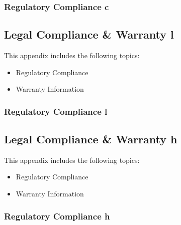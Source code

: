 \documentclass[letterpaper,10pt,openany,oneside,english]{sphinxmanual}
\begin{document}
\subsubsection{Regulatory Compliance c}
\label{\detokenize{ukcompany:regulatory-compliance-c}}

\subsection{Legal Compliance \& Warranty l}
\label{\detokenize{advisoryservice:legal-compliance-warranty-l}}\label{\detokenize{advisoryservice::doc}}
This appendix includes the following topics:
\begin{itemize}
\item {} 
Regulatory Compliance

\item {} 
Warranty Information

\end{itemize}


\subsubsection{Regulatory Compliance l}
\label{\detokenize{advisoryservice:regulatory-compliance-l}}

\subsection{Legal Compliance \& Warranty h}
\label{\detokenize{legalandaccounting:legal-compliance-warranty-h}}\label{\detokenize{legalandaccounting::doc}}
This appendix includes the following topics:
\begin{itemize}
\item {} 
Regulatory Compliance

\item {} 
Warranty Information

\end{itemize}


\subsubsection{Regulatory Compliance h}
\label{\detokenize{legalandaccounting:regulatory-compliance-h}}

\subsection{}
\label{\detokenize{index:document-author-s}}
\end{document}
